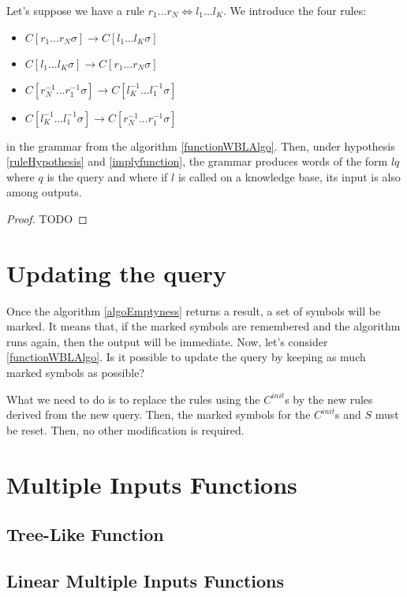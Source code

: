 \documentclass[10pt,a4paper,draft]{article}
\begin{document}
\begin{Property}
Let's suppose we have a rule $r_1 ... r_N \Leftrightarrow l_1 ... l_K$. We introduce the four rules:
\begin{itemize}
\item $C[r_1...r_N \sigma] \rightarrow C[l_1 ... l_K \sigma]$
\item $C[l_1 ... l_K \sigma] \rightarrow C[r_1...r_N \sigma]$
\item $C[r_N^{-1} ... r_1^{-1} \sigma] \rightarrow C[l_K^{-1} ... l_1^{-1} \sigma]$
\item $C[l_K^{-1} ... l_1^{-1} \sigma] \rightarrow C[r_N^{-1} ... r_1^{-1} \sigma]$
\end{itemize}
in the grammar from the algorithm \ref{functionWBLAlgo}. Then, under hypothesis \ref{ruleHypothesis} and \ref{implyfunction}, the grammar produces words of the form $lq$ where $q$ is the query and where if $l$ is called on a knowledge base, its input is also among outputs.
\end{Property}

\begin{proof}
TODO
\end{proof}

\section{Updating the query}

Once the algorithm \ref{algoEmptyness} returns a result, a set of symbols will be marked. It means that, if the marked symbols are remembered and the algorithm runs again, then the output will be immediate. Now, let's consider \ref{functionWBLAlgo}. Is it possible to update the query by keeping as much marked symbols as possible?

What we need to do is to replace the rules using the $C^{init}$s by the new rules derived from the new query. Then, the marked symbols for the $C^{init}$s and $S$ must be reset. Then, no other modification is required.

\section{Multiple Inputs Functions}

\subsection{Tree-Like Function}

\subsection{Linear Multiple Inputs Functions}



\end{document}

